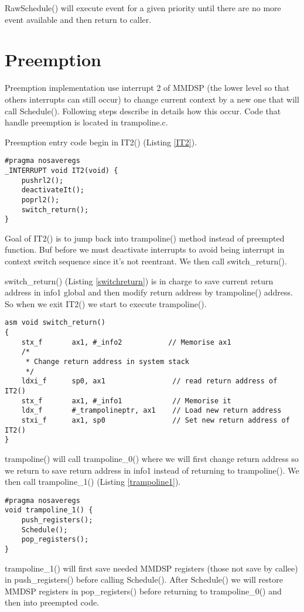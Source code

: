 RawSchedule() will execute event for a given priority until there are no more
event available and then return to caller.

\section{Preemption}
Preemption implementation use interrupt 2 of MMDSP (the lower level so that
others interrupts can still occur) to change current context by a new one that
will call Schedule(). Following steps describe in details how this occur. Code
that handle preemption is located in trampoline.c.

Preemption entry code begin in IT2() (Listing \ref{IT2}).
\begin{lstlisting}[caption=IT2(), label=IT2]
#pragma nosaveregs
_INTERRUPT void IT2(void) {
    pushrl2();
    deactivateIt();
    poprl2();
    switch_return();
}
\end{lstlisting}
Goal of IT2() is to jump back into trampoline() method instead of preempted
function. Buf before we must deactivate interrupts to avoid being interrupt in
context switch sequence since it's not reentrant. We then call switch\_return().

switch\_return() (Listing \ref{switchreturn}) is in charge to save current
return address in info1 global and then modify return address by trampoline()
address. So when we exit IT2() we start to execute trampoline().
\begin{lstlisting}[caption=switch\_return(), label=switchreturn]
asm void switch_return()
{
    stx_f       ax1, #_info2           // Memorise ax1
    /*
     * Change return address in system stack
     */
    ldxi_f      sp0, ax1                // read return address of IT2()
    stx_f       ax1, #_info1            // Memorise it
    ldx_f       #_trampolineptr, ax1    // Load new return address
    stxi_f      ax1, sp0                // Set new return address of IT2()
}
\end{lstlisting}

trampoline() will call trampoline\_0() where we will first change return address
so we return to save return address in info1 instead of returning to
trampoline(). We then call trampoline\_1() (Listing \ref{trampoline1}).
\begin{lstlisting}[caption=trampoline\_1(), label=trampoline1]
#pragma nosaveregs
void trampoline_1() {
    push_registers();
    Schedule();
    pop_registers();
}
\end{lstlisting}

trampoline\_1() will first save needed MMDSP registers (those not save by
callee) in push\_registers() before calling Schedule(). After Schedule() we will
restore MMDSP registers in pop\_registers() before returning to trampoline\_0()
and then into preempted code.
